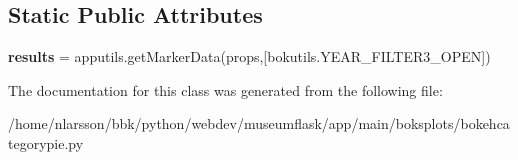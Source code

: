 \subsection*{Static Public Attributes}
\begin{DoxyCompactItemize}
\item 
\mbox{\label{classapp_1_1main_1_1boksplots_1_1bokehcategorypie_1_1BokehCategoryPie_ada8481765c445790ca87768097f05895}} 
{\bfseries results} = apputils.\+get\+Marker\+Data(props,\mbox{[}bokutils.\+Y\+E\+A\+R\+\_\+\+F\+I\+L\+T\+E\+R3\+\_\+\+O\+P\+EN\mbox{]})
\end{DoxyCompactItemize}


The documentation for this class was generated from the following file\+:\begin{DoxyCompactItemize}
\item 
/home/nlarsson/bbk/python/webdev/museumflask/app/main/boksplots/bokehcategorypie.\+py\end{DoxyCompactItemize}
